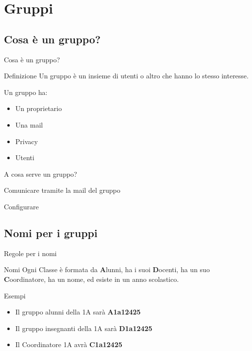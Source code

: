 \section{Gruppi}
\subsection{Cosa è un gruppo?}
\begin{frame}{Cosa è un gruppo?}
	\begin{alertblock}{Definizione}
	Un gruppo è un insieme di utenti o altro che hanno lo stesso interesse.
	\end{alertblock}
	Un gruppo ha:
	\begin{itemize}
		\item Un proprietario
		\item Una mail
		\item Privacy
		\item Utenti
	\end{itemize}
\end{frame}
\begin{frame}{A cosa serve un gruppo?}
	\begin{block}{}
		Comunicare tramite la mail del gruppo
	\end{block}
	\begin{block}{}
		Configurare
	\end{block}
\end{frame}
\subsection{Nomi per i gruppi}
\begin{frame}{Regole per i nomi}
	\begin{alertblock}{Nomi}
		Ogni Classe è formata da \textbf{A}lunni, ha i suoi \textbf{D}ocenti, ha un suo \textbf{C}oordinatore, ha un nome, ed esiste in un anno scolastico.
	\end{alertblock}
	\begin{block}{Esempi}
		\begin{itemize}
			\item 	Il gruppo alunni della 1A sarà \textbf{A1a12425}
			\item 	Il gruppo insegnanti della 1A sarà \textbf{D1a12425}
			\item 	Il Coordinatore  1A avrà \textbf{C1a12425}
		\end{itemize}
	\end{block}
\end{frame}